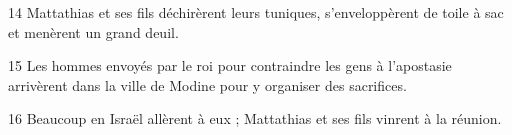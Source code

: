 
14 Mattathias et ses fils déchirèrent leurs tuniques, s’enveloppèrent de toile à sac et menèrent un grand deuil.

15 Les hommes envoyés par le roi pour contraindre les gens à l’apostasie arrivèrent dans la ville de Modine pour y organiser des sacrifices.

16 Beaucoup en Israël allèrent à eux ; Mattathias et ses fils vinrent à la réunion.
